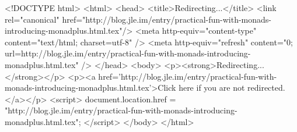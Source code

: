 <!DOCTYPE html>
<html>
<head>
<title>Redirecting...</title>
<link rel="canonical" href="http://blog.jle.im/entry/practical-fun-with-monads-introducing-monadplus.html.tex"/>
<meta http-equiv="content-type" content="text/html; charset=utf-8" />
<meta http-equiv="refresh" content="0; url=http://blog.jle.im/entry/practical-fun-with-monads-introducing-monadplus.html.tex" />
</head>
<body>
  <p><strong>Redirecting...</strong></p>
  <p><a href='http://blog.jle.im/entry/practical-fun-with-monads-introducing-monadplus.html.tex'>Click here if you are not redirected.</a></p>
  <script>
    document.location.href = "http://blog.jle.im/entry/practical-fun-with-monads-introducing-monadplus.html.tex";
  </script>
</body>
</html>
